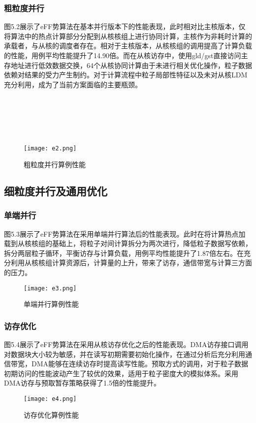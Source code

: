 \subsubsection{粗粒度并行}
图5.2展示了eFF势算法在基本并行版本下的性能表现，此时相对比主核版本，仅将算法中的热点计算部分分配到从核核组上进行协同计算，主核作为非耗时计算的承载者，与从核的调度者存在。相对于主核版本，从核核组的调用提高了计算负载的性能，用例平均性能提升了14.90倍。而在从核访存中，使用gld/gst直接访问主存地址进行低效数据交换，64个从核协同计算由于未进行相关优化操作，粒子数据依赖对结果的受力产生制约。对于计算流程中粒子局部性特征以及未对从核LDM充分利用，成为了当前方案面临的主要瓶颈。\\ \\ \\ \\ \\ \\
 \begin{figure}[h]
  \centering
  \texttt{[image: e2.png]}
  \caption{粗粒度并行算例性能}
\end{figure}

\subsection{细粒度并行及通用优化}
\subsubsection{单端并行}
图5.3展示了eFF势算法在采用单端并行算法后的性能表现。此时在将计算热点加载到从核核组的基础上，将粒子对间计算拆分为两次进行，降低粒子数据写依赖，拆分两层粒子循环，平衡访存与计算负载，用例平均性能提升了1.87倍左右。在充分利用从核核组计算资源后，计算量的上升，带来了访存，通信带宽与计算三方面的压力。
 \begin{figure}[h]
  \centering
  \texttt{[image: e3.png]}
  \caption{单端并行算例性能}
\end{figure}

\subsubsection{访存优化}
图5.4展示了eFF势算法在采用从核访存优化之后的性能表现。DMA访存接口调用对数据块大小较为敏感，并在读写初期需要初始化操作，在通过分析后充分利用通信带宽，DMA能够在连续访存时提高读写性能。预取方式的调用，对于粒子数据初期访问的性能波动产生了较优的效果，适用于粒子密度大的模拟体系。采用DMA访存与预取暂存策略获得了1.5倍的性能提升。
 \begin{figure}[h]
  \centering
  \texttt{[image: e4.png]}
  \caption{访存优化算例性能}
\end{figure}

